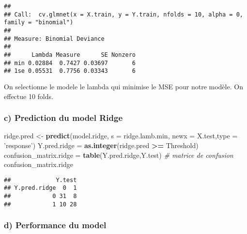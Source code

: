 \documentclass[
]{article}
\newenvironment{Shaded}{\begin{snugshade}}{\end{snugshade}}
\newcommand{\CommentTok}[1]{\textcolor[rgb]{0.56,0.35,0.01}{\textit{#1}}}
\newcommand{\DataTypeTok}[1]{\textcolor[rgb]{0.13,0.29,0.53}{#1}}
\newcommand{\KeywordTok}[1]{\textcolor[rgb]{0.13,0.29,0.53}{\textbf{#1}}}
\newcommand{\NormalTok}[1]{#1}
\newcommand{\OperatorTok}[1]{\textcolor[rgb]{0.81,0.36,0.00}{\textbf{#1}}}
\newcommand{\StringTok}[1]{\textcolor[rgb]{0.31,0.60,0.02}{#1}}
\begin{document}
\begin{verbatim}
## 
## Call:  cv.glmnet(x = X.train, y = Y.train, nfolds = 10, alpha = 0, family = "binomial") 
## 
## Measure: Binomial Deviance 
## 
##      Lambda Measure      SE Nonzero
## min 0.02884  0.7427 0.03697       6
## 1se 0.05531  0.7756 0.03343       6
\end{verbatim}

\begin{Shaded}
\end{Shaded}

On selectionne le modele le lambda qui minimise le MSE pour notre
modèle. On effectue 10 folds.

\hypertarget{c-prediction-du-model-ridge}{%
\subsubsection{c) Prediction du model
Ridge}\label{c-prediction-du-model-ridge}}

\begin{Shaded}
\begin{Highlighting}[]
\NormalTok{ridge.pred <-}\StringTok{ }\KeywordTok{predict}\NormalTok{(model.ridge, }\DataTypeTok{s =}\NormalTok{ ridge.lamb.min, }\DataTypeTok{newx =}\NormalTok{ X.test,}\DataTypeTok{type =} \StringTok{'response'}\NormalTok{)}
\NormalTok{Y.pred.ridge =}\StringTok{  }\KeywordTok{as.integer}\NormalTok{(ridge.pred }\OperatorTok{>=}\StringTok{ }\NormalTok{Threshold)}
\NormalTok{confusion_matrix.ridge =}\StringTok{ }\KeywordTok{table}\NormalTok{(Y.pred.ridge,Y.test) }\CommentTok{# matrice de confusion}
\NormalTok{confusion_matrix.ridge}
\end{Highlighting}
\end{Shaded}

\begin{verbatim}
##             Y.test
## Y.pred.ridge  0  1
##            0 31  8
##            1 10 28
\end{verbatim}

\hypertarget{d-performance-du-model}{%
\subsubsection{d) Performance du model}\label{d-performance-du-model}}
\end{document}
